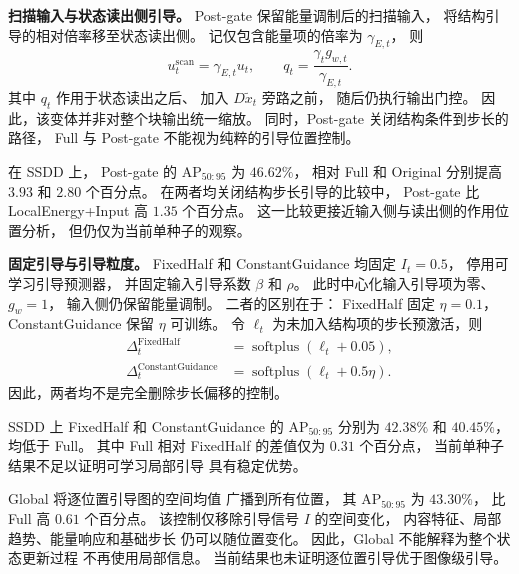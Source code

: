 \documentclass[journal]{IEEEtran}
\begin{document}
\textbf{扫描输入与状态读出侧引导。}
Post-gate 保留能量调制后的扫描输入，
将结构引导的相对倍率移至状态读出侧。
记仅包含能量项的倍率为 $\gamma_{E,t}$，
则
\begin{equation}
u_t^{\mathrm{scan}}=\gamma_{E,t}u_t,
\qquad
q_t=\frac{\gamma_t g_{w,t}}{\gamma_{E,t}}.
\label{eq:ablation_post_gate}
\end{equation}
其中 $q_t$ 作用于状态读出之后、
加入 $D\widetilde{x}_t$ 旁路之前，
随后仍执行输出门控。
因此，该变体并非对整个块输出统一缩放。
同时，Post-gate 关闭结构条件到步长的路径，
Full 与 Post-gate 不能视为纯粹的引导位置控制。

在 SSDD 上，
Post-gate 的 $\mathrm{AP}_{50:95}$ 为 $46.62\%$，
相对 Full 和 Original
分别提高 $3.93$ 和 $2.80$ 个百分点。
在两者均关闭结构步长引导的比较中，
Post-gate 比 LocalEnergy+Input
高 $1.35$ 个百分点。
这一比较更接近输入侧与读出侧的作用位置分析，
但仍仅为当前单种子的观察。

\textbf{固定引导与引导粒度。}
FixedHalf 和 ConstantGuidance
均固定 $I_t=0.5$，
停用可学习引导预测器，
并固定输入引导系数 $\beta$ 和 $\rho$。
此时中心化输入引导项为零、$g_w=1$，
输入侧仍保留能量调制。
二者的区别在于：
FixedHalf 固定 $\eta=0.1$，
ConstantGuidance 保留 $\eta$ 可训练。
令 $\ell_t$ 为未加入结构项的步长预激活，则
\begin{equation}
\begin{aligned}
\Delta_t^{\mathrm{FixedHalf}}
&=\operatorname{softplus}(\ell_t+0.05),\\
\Delta_t^{\mathrm{ConstantGuidance}}
&=\operatorname{softplus}(\ell_t+0.5\eta).
\end{aligned}
\label{eq:ablation_fixed_guidance}
\end{equation}
因此，两者均不是完全删除步长偏移的控制。

SSDD 上 FixedHalf 和 ConstantGuidance 的
$\mathrm{AP}_{50:95}$ 分别为
$42.38\%$ 和 $40.45\%$，
均低于 Full。
其中 Full 相对 FixedHalf 的差值仅为
$0.31$ 个百分点，
当前单种子结果不足以证明可学习局部引导
具有稳定优势。

Global 将逐位置引导图的空间均值
广播到所有位置，
其 $\mathrm{AP}_{50:95}$ 为 $43.30\%$，
比 Full 高 $0.61$ 个百分点。
该控制仅移除引导信号 $I$ 的空间变化，
内容特征、局部趋势、能量响应和基础步长
仍可以随位置变化。
因此，Global 不能解释为整个状态更新过程
不再使用局部信息。
当前结果也未证明逐位置引导优于图像级引导。
\end{document}
